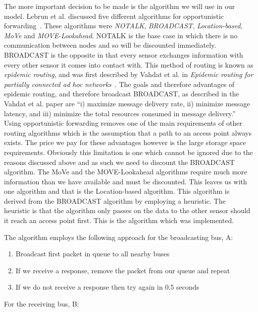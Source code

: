         The more important decision to be made is the algorithm we will use in our model. Lebrun et al. discussed five different algorithms for opportunistic forwarding~\cite{opportunisticforwarding}. These algorithms were \emph{NOTALK}, \emph{BROADCAST}, \emph{Location-based}, \emph{MoVe} and \emph{MOVE-Lookahead}. NOTALK is the base case in which there is no communication between nodes and so will be discounted immediately. BROADCAST is the opposite in that every sensor exchanges information with every other sensor it comes into contact with. This method of routing is known as \emph{epidemic routing}, and was first described by Vahdat et al. in \emph{Epidemic routing for partially connected ad hoc networks}~\cite{vahdat2000epidemic}. The goals and therefore advantages of epidemic routing, and therefore broadcast BROADCAST, as described in the Vahdat et al. paper are ``i) maximize message delivery rate, ii) minimize message latency, and iii) minimize the total resources consumed in message delivery.'' Using opportunistic forwarding removes one of the main requirements of other routing algorithms which is the assumption that a path to an access point always exists. The price we pay for these advantages however is the large storage space requirements. Obviously this limitation is one which cannot be ignored due to the reasons discussed above and as such we need to discount the BROADCAST algorithm. The MoVe and the MOVE-Lookahead algorithms require much more information than we have available and must be discounted. This leaves us with one algorithm and that is the Location-based algorithm. This algorithm is derived from the BROADCAST algorithm by employing a heuristic. The heuristic is that the algorithm only passes on the data to the other sensor should it reach an access point first. This is the algorithm which was implemented. 

        The algorithm employs the following approach for the broadcasting bus, A:


        \begin{enumerate}
            \item Broadcast first packet in queue to all nearby buses
            \item If we receive a response, remove the packet from our queue and repeat
            \item If we do not receive a response then try again in 0.5 seconds
        \end{enumerate}

        For the receiving bus, B:

